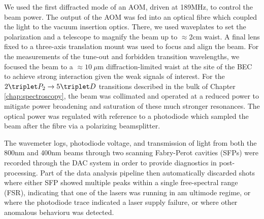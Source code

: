 	We used the first diffracted mode of an AOM, driven at 189MHz, to control the beam power.
	The output of the AOM was fed into an optical fibre which coupled the light to the vacuum insertion optics.
	There, we used waveplates to set the polarization and a telescope to magnify the beam up to $\approx$2cm waist.
	A final lens fixed to a three-axis translation mount was used to focus and align the beam.
	For the measurements of the tune-out and forbidden transition wavelengths, we focused the beam to a $\approx 10~\mu$m diffraction-limited waist at the site of the BEC to achieve strong interaction given the weak signals of interest.
	For the $2\triplet P_2\rightarrow 5\triplet D$ transitions described in the bulk of Chapter \ref{chap:spectroscopy}, the beam was collimated and operated at a reduced power to mitigate power broadening and saturation of these much stronger resonances.
	The optical power was regulated with reference to a photodiode which sampled the beam after the fibre via a polarizing beamsplitter.

	The wavemeter logs, photodiode voltage, and transmission of light from both the 800nm and 400nm beams through two scanning Fabry-Perot cavities (SFPs) were recorded through the DAC system in order to provide diagnostics in post-processing.
	Part of the data analysis pipeline then automatically discarded shots where either SFP showed multiple peaks within a single free-spectral range (FSR), indicating that one of the lasers was running in am ultimode regime, or where the photodiode trace indicated a laser supply failure, or where other anomalous behavioru was detected.



